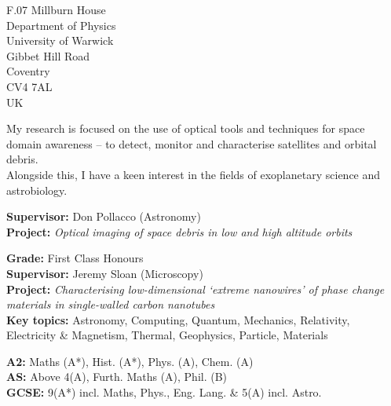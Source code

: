 
\begin{flushright}
\vspace{-1em}
\small F.07 Millburn House \\
Department of Physics \\
University of Warwick \\
Gibbet Hill Road \\
Coventry \\
CV4 7AL \\
UK
\end{flushright}

\medskip


\small My research is focused on the use of optical tools and techniques for space domain awareness -- to detect, monitor and characterise satellites and orbital debris. \\
Alongside this, I have a keen interest in the fields of exoplanetary science and astrobiology.

\medskip


\vspace{-1em}
\small \justify \textbf{Supervisor:} Don Pollacco (Astronomy) \\
\textbf{Project:} \textit{Optical imaging of space debris in low and high altitude orbits}

\divider

\small \textbf{Grade:} First Class Honours \\
\textbf{Supervisor:} Jeremy Sloan (Microscopy) \\
\textbf{Project:} \textit{Characterising low-dimensional `extreme nanowires' of phase change materials in single-walled carbon nanotubes} \\
\textbf{Key topics:} Astronomy, Computing, Quantum, Mechanics, Relativity, Electricity \& Magnetism, Thermal, Geophysics, Particle, Materials

\divider

\small \textbf{A2:} Maths (A*), Hist. (A*), Phys. (A), Chem. (A) \\
\textbf{AS:} Above 4(A), Furth. Maths (A), Phil. (B) \\
\textbf{GCSE:} 9(A*) incl. Maths, Phys., Eng. Lang. \& 5(A) incl. Astro.
